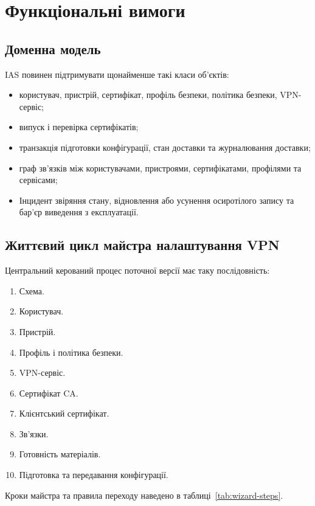\documentclass{article}
\begin{document}
\section{Функціональні вимоги}
\subsection{Доменна модель}
IAS повинен підтримувати щонайменше такі класи об'єктів:
\begin{itemize}
  \item користувач, пристрій, сертифікат, профіль безпеки, політика безпеки, VPN-сервіс;
  \item випуск і перевірка сертифікатів;
  \item транзакція підготовки конфігурації, стан доставки та журналювання доставки;
  \item граф зв’язків між користувачами, пристроями, сертифікатами, профілями та сервісами;
  \item Інцидент звіряння стану, відновлення або усунення осиротілого запису та бар’єр виведення з експлуатації.
\end{itemize}

\subsection{Життєвий цикл майстра налаштування VPN}
Центральний керований процес поточної версії має таку послідовність:
\begin{enumerate}
  \item Схема.
  \item Користувач.
  \item Пристрій.
  \item Профіль і політика безпеки.
  \item VPN-сервіс.
  \item Сертифікат CA.
  \item Клієнтський сертифікат.
  \item Зв’язки.
  \item Готовність матеріалів.
  \item Підготовка та передавання конфігурації.
\end{enumerate}

Кроки майстра та правила переходу наведено в таблиці~\ref{tab:wizard-steps}.
\end{document}
